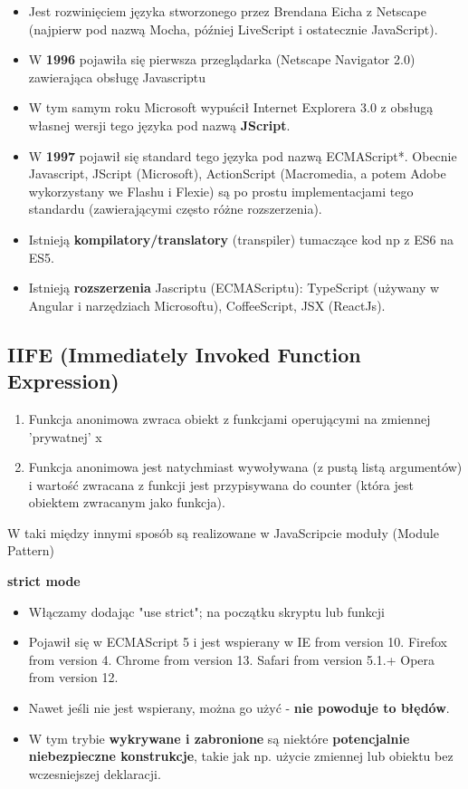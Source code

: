 \documentclass[../main.tex]{subfiles}
\begin{document}
    \begin{itemize}
        \item Jest rozwinięciem języka stworzonego przez Brendana Eicha z Netscape (najpierw pod nazwą Mocha, później LiveScript i ostatecznie JavaScript).
        \item W \textbf{1996} pojawiła się pierwsza przeglądarka (Netscape Navigator 2.0) zawierająca obsługę Javascriptu
        \item W tym samym roku Microsoft wypuścił Internet Explorera 3.0 z obsługą własnej wersji tego języka pod nazwą \textbf{JScript}.
        \item W \textbf{1997} pojawił się standard tego języka pod nazwą ECMAScript*. Obecnie Javascript, JScript (Microsoft), ActionScript (Macromedia, a potem Adobe wykorzystany we Flashu i Flexie) są po prostu implementacjami tego standardu (zawierającymi często różne rozszerzenia).
        \item Istnieją \textbf{kompilatory/translatory} (transpiler) tumaczące kod np z ES6 na ES5.
        \item Istnieją \textbf{rozszerzenia} Jascriptu (ECMAScriptu): TypeScript (używany w Angular i narzędziach Microsoftu), CoffeeScript, JSX (ReactJs).
    \end{itemize}

    \subsection{IIFE (Immediately Invoked Function Expression)}
    \begin{enumerate}
        \item Funkcja anonimowa zwraca obiekt z funkcjami operującymi na zmiennej 'prywatnej' x
        \item Funkcja anonimowa jest natychmiast wywoływana (z pustą listą argumentów) i wartość zwracana z funkcji jest przypisywana do counter (która jest obiektem zwracanym jako funkcja).
    \end{enumerate}
    W taki między innymi sposób są realizowane w JavaScripcie moduły (Module Pattern)


    \textbf{strict mode}
    \begin{itemize}
        \item Włączamy dodając "use strict"; na początku skryptu lub funkcji
        \item Pojawił się w ECMAScript 5 i jest wspierany w IE from version 10. Firefox from version 4.
        Chrome from version 13. Safari from version 5.1.+ Opera from version 12.
        \item Nawet jeśli nie jest wspierany, można go użyć - \textbf{nie powoduje to błędów}.
        \item W tym trybie \textbf{wykrywane i zabronione} są niektóre \textbf{potencjalnie niebezpieczne konstrukcje}, takie jak np. użycie zmiennej lub obiektu bez wczesniejszej deklaracji.
    \end{itemize}
\end{document}
